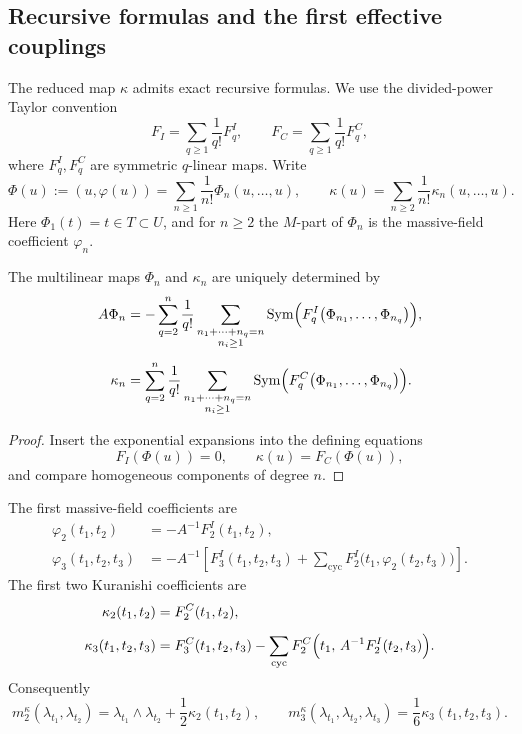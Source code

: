 \subsection{Recursive formulas and the first effective couplings}

The reduced map $\kappa$ admits exact recursive formulas.  We use the
divided-power Taylor convention
\[
F_I=\sum_{q\ge 1}\frac{1}{q!}F_q^I,
\qquad
F_C=\sum_{q\ge 1}\frac{1}{q!}F_q^C,
\]
where \(F_q^I,F_q^C\) are symmetric \(q\)-linear maps.  Write
\[
\Phi(u):=(u,\varphi(u))=\sum_{n\ge 1}\frac{1}{n!}\Phi_n(u,\dots,u),
\qquad
\kappa(u)=\sum_{n\ge 2}\frac{1}{n!}\kappa_n(u,\dots,u).
\]
Here \(\Phi_1(t)=t\in T\subset U\), and for \(n\ge2\) the \(M\)-part of
\(\Phi_n\) is the massive-field coefficient \(\varphi_n\).

\begin{proposition}\label{prop:recursive-kuranishi}
The multilinear maps $\Phi_n$ and $\kappa_n$ are uniquely determined by
\begin{align}
A\Phi_n
&=
-
\sum_{q=2}^{n}
\frac{1}{q!}
\sum_{\substack{n_1+\cdots+n_q=n\\ n_i\ge 1}}
\operatorname{Sym}\Bigl(F_q^I\bigl(\Phi_{n_1},\dots,\Phi_{n_q}\bigr)\Bigr),
\label{eq:phi-recursion}
\\[0.5em]
\kappa_n
&=
\sum_{q=2}^{n}
\frac{1}{q!}
\sum_{\substack{n_1+\cdots+n_q=n\\ n_i\ge 1}}
\operatorname{Sym}\Bigl(F_q^C\bigl(\Phi_{n_1},\dots,\Phi_{n_q}\bigr)\Bigr).
\label{eq:kappa-recursion}
\end{align}
\end{proposition}

\begin{proof}
Insert the exponential expansions into the defining equations
\[
F_I(\Phi(u))=0,
\qquad
\kappa(u)=F_C(\Phi(u)),
\]
and compare homogeneous components of degree $n$.
\end{proof}

\begin{corollary}\label{cor:low-order-kappa}
The first massive-field coefficients are
\begin{align}
\varphi_2(t_1,t_2)
&=
-A^{-1}F_2^I(t_1,t_2),
\label{eq:massive-field-i2}
\\[0.5em]
\varphi_3(t_1,t_2,t_3)
&=
-A^{-1}\left[
F_3^I(t_1,t_2,t_3)
+\sum_{\mathrm{cyc}}
F_2^I\bigl(t_1,\varphi_2(t_2,t_3)\bigr)
\right].
\label{eq:massive-field-i3}
\end{align}
The first two Kuranishi coefficients are
\begin{align}
\kappa_2(t_1,t_2)
&=
F_2^C(t_1,t_2),
\label{eq:kappa2}
\\[0.5em]
\kappa_3(t_1,t_2,t_3)
&=
F_3^C(t_1,t_2,t_3)
-
\sum_{\mathrm{cyc}}
F_2^C\Bigl(t_1,\,A^{-1}F_2^I(t_2,t_3)\Bigr).
\label{eq:kappa3}
\end{align}
Consequently
\[
m_2^\kappa(\lambda_{t_1},\lambda_{t_2})
=
\lambda_{t_1}\wedge \lambda_{t_2}
+\frac{1}{2}\kappa_2(t_1,t_2),
\qquad
m_3^\kappa(\lambda_{t_1},\lambda_{t_2},\lambda_{t_3})
=
\frac{1}{6}\kappa_3(t_1,t_2,t_3).
\]
\end{corollary}

